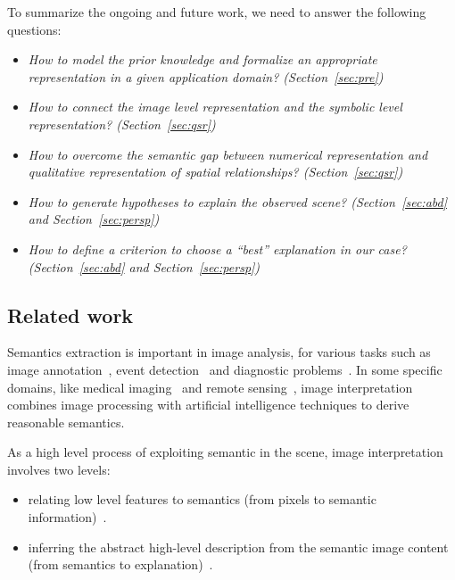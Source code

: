 \documentclass{article}
\begin{document}
To summarize the ongoing and future work, we need to answer the following questions:
\begin{itemize}
 \item \textit{How to model the prior knowledge and formalize an appropriate representation in a given application domain? (Section~\ref{sec:pre})}
 \item \textit{How to connect the image level representation and the symbolic level representation? (Section~\ref{sec:qsr})}
 \item \textit{How to overcome the semantic gap between numerical representation and qualitative representation of spatial relationships? (Section~\ref{sec:qsr})}
 \item \textit{How to generate hypotheses to explain the observed scene? (Section~\ref{sec:abd} and Section~\ref{sec:persp})}
 \item \textit{How to define a criterion to choose a ``best'' explanation in our case? (Section~\ref{sec:abd} and Section~\ref{sec:persp})}
\end{itemize}

 \subsection{Related work}
Semantics extraction is important in image analysis, for various tasks such as image annotation~\cite{tousch2012semantic}, event detection~\cite{lavee2009understanding} and 
diagnostic problems~\cite{atif2014explanatory,atif2007grafip}.
In some specific domains, like medical imaging~\cite{atif2014explanatory,Bloch2005fuzzy,fouquier2012sequential,nempont2013constraint} and
remote sensing~\cite{forestier2012knowledge,vanegas2010detection}, image interpretation combines image processing with artificial intelligence techniques to derive reasonable semantics.  

As a high level process of exploiting semantic in the scene, image interpretation involves two levels:
\begin{itemize}
 \item relating low level features to semantics (from pixels to semantic information)~\cite{Bloch2005fuzzy,fouquier2012sequential,Hudelot2008fuzzy,nempont2013constraint}.
 \item inferring the abstract high-level description from the semantic image content (from semantics to explanation)~\cite{atif2014explanatory,Espinosa07multimedia}.
\end{itemize}
\end{document}
